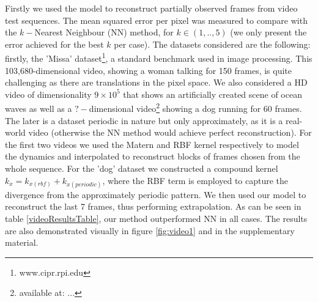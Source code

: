 \documentclass{article} %
\begin{document}
Firstly we used the model to reconstruct partially observed frames
from video test sequences. The mean squared error per pixel was
measured to compare with the $k-$Nearest Neighbour (NN) method, for $k
\in (1,..,5)$ (we only present the error achieved for the best $k$ per
case). The datasets considered are the following: firstly, the 'Missa'
dataset\footnote{www.cipr.rpi.edu}, a standard benchmark used in image
processing. This 103,680-dimensional video, showing a woman talking
for 150 frames, is quite challenging as there are translations in the
pixel space. We also considered a HD video of dimensionality $9 \times
10^5$ that shows an artificially created scene of ocean waves as well
as a $?-$dimensional video\footnote{available at: ...} showing a dog
running for $60$ frames. The later is a dataset periodic in nature but
only approximately, as it is a real-world video (otherwise the NN
method would achieve perfect reconstruction). For the first two videos
we used the Matern and RBF kernel respectively to model the dynamics and interpolated to
reconstruct blocks of frames chosen from the whole sequence. For the
 'dog' dataset we constructed a compound kernel $k_x = k_{x(rbf)} +
k_{x(periodic)}$, where the RBF term is employed to capture the
divergence from the approximately periodic pattern. We then used our
model to reconstruct the last 7 frames, thus performing
extrapolation. As can be seen in table \ref{videoResultsTable}, our
method outperformed NN in all cases. The results are also demonstrated
visually in figure \ref{fig:video1} and in the supplementary material.



\end{document}
